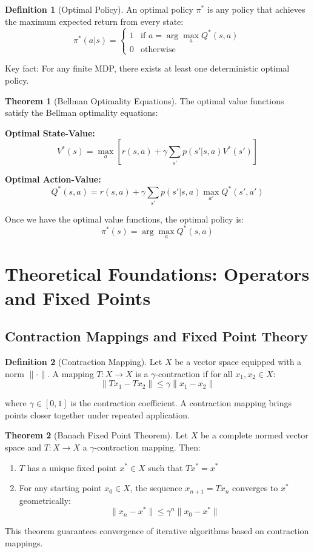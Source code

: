 \documentclass[12pt,a4paper]{article}
\theoremstyle{definition}
\newtheorem{definition}{Definition}[section]
\newtheorem{theorem}{Theorem}[section]
\begin{document}
\begin{definition}[Optimal Policy]
An optimal policy $\pi^*$ is any policy that achieves the maximum expected return from every state:
\[
\pi^*(a|s) = \begin{cases} 1 & \text{if } a = \arg\max_a Q^*(s, a) \\ 0 & \text{otherwise} \end{cases}
\]

Key fact: For any finite MDP, there exists at least one deterministic optimal policy.
\end{definition}

\begin{theorem}[Bellman Optimality Equations]
The optimal value functions satisfy the Bellman optimality equations:

\textbf{Optimal State-Value:}
\[
V^*(s) = \max_a \left[ r(s, a) + \gamma \sum_{s'} p(s' | s, a) V^*(s') \right]
\]

\textbf{Optimal Action-Value:}
\[
Q^*(s, a) = r(s, a) + \gamma \sum_{s'} p(s' | s, a) \max_{a'} Q^*(s', a')
\]

Once we have the optimal value functions, the optimal policy is:
\[
\pi^*(s) = \arg\max_a Q^*(s, a)
\]
\end{theorem}

\section{Theoretical Foundations: Operators and Fixed Points}

\subsection{Contraction Mappings and Fixed Point Theory}

\begin{definition}[Contraction Mapping]
Let $X$ be a vector space equipped with a norm $\|\cdot\|$. A mapping $T: X \to X$ is a $\gamma$-contraction if for all $x_1, x_2 \in X$:
\[
\|T x_1 - T x_2\| \leq \gamma \|x_1 - x_2\|
\]

where $\gamma \in [0, 1]$ is the contraction coefficient. A contraction mapping brings points closer together under repeated application.
\end{definition}

\begin{theorem}[Banach Fixed Point Theorem]
Let $X$ be a complete normed vector space and $T: X \to X$ a $\gamma$-contraction mapping. Then:

\begin{enumerate}
    \item $T$ has a unique fixed point $x^* \in X$ such that $Tx^* = x^*$
    \item For any starting point $x_0 \in X$, the sequence $x_{n+1} = Tx_n$ converges to $x^*$ geometrically:
    \[
    \|x_n - x^*\| \leq \gamma^n \|x_0 - x^*\|
    \]
\end{enumerate}

This theorem guarantees convergence of iterative algorithms based on contraction mappings.
\end{theorem}
\end{document}
